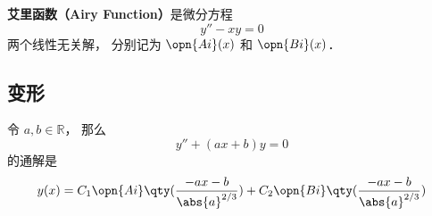 
\begin{issues}
\issueDraft
\end{issues}

\textbf{艾里函数（Airy Function）}是微分方程
\begin{equation}
y'' - xy = 0
\end{equation}
两个线性无关解， 分别记为 $\opn{Ai}(x)$ 和 $\opn{Bi}(x)$．


\subsection{变形}
令 $a, b\in \mathbb R$， 那么
\begin{equation}
y'' + (ax + b) y = 0
\end{equation}
的通解是
\begin{equation}
y(x) = C_1\opn{Ai}\qty(\frac{-ax-b}{\abs{a}^{2/3}}) + C_2 \opn{Bi}\qty(\frac{-ax-b}{\abs{a}^{2/3}})
\end{equation}

